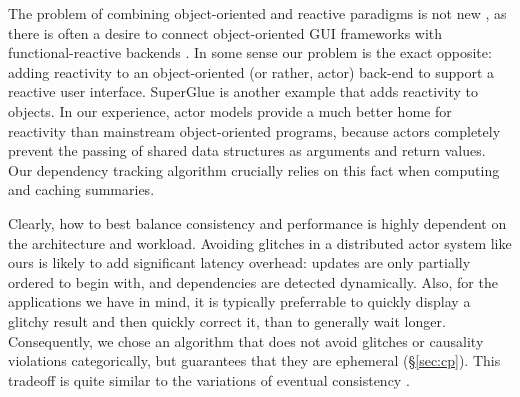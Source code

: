 The problem of combining object-oriented and reactive paradigms is not new \cite{Salvaneschi:2013:RBO:2451436.2451442}, as there is often a desire to connect object-oriented GUI frameworks with functional-reactive backends \cite{statelines}. In some sense our problem is the exact opposite: adding reactivity to an object-oriented (or rather, actor) back-end to support a reactive user interface.  SuperGlue \cite{superglue} is another example that adds reactivity to objects. In our experience, actor models provide a much better home for reactivity than mainstream object-oriented programs, because actors completely prevent the passing of shared data structures as arguments and return values. Our dependency tracking algorithm crucially relies on this fact when computing and caching summaries.



Clearly, how to best balance consistency and performance is highly dependent on the architecture and workload. 
Avoiding glitches in a distributed actor system like ours is likely to add significant latency overhead: updates are only partially ordered to begin with, and dependencies are detected dynamically. Also, for the applications we have in mind, it is typically preferrable to quickly display a glitchy result and then quickly correct it, than to generally wait longer. Consequently, we chose an algorithm that does not avoid glitches or causality violations categorically, but guarantees that they are ephemeral (\S\ref{sec:cp}). This tradeoff is quite similar to the variations of eventual consistency \cite{principles}.
 





